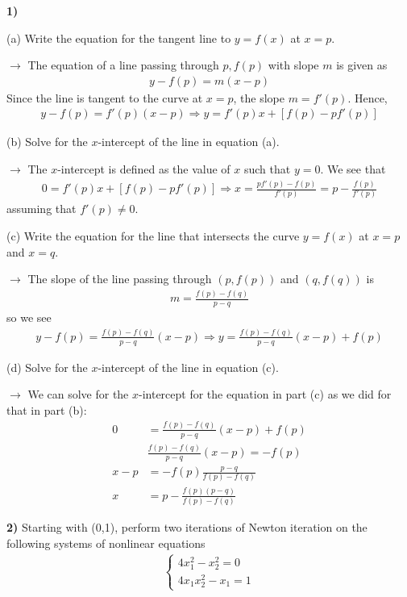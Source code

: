 \documentclass[12pt,a4paper]{article}
\newcommand{\prob}[2]{\textbf{#1)} #2}
\begin{document}
\prob{1}{}

(a) Write the equation for the tangent line to $y = f(x)$ at $x = p$.

$\rightarrow$ The equation of a line passing through $p,f(p)$ with slope $m$ is given as
\begin{align*}
y-f(p) = m(x-p)
\end{align*}
Since the line is tangent to the curve at $x = p$, the slope $m = f'(p)$. Hence,
\begin{align*}
y - f(p) = f'(p)(x-p) \Rightarrow y = f'(p)x + [f(p) - pf'(p)]
\end{align*}

(b) Solve for the $x$-intercept of the line in equation (a).

$\rightarrow$ The $x$-intercept is defined as the value of $x$ such that $y = 0$. We see that
\begin{align*}
0 = f'(p)x + [f(p) - pf'(p)] \Rightarrow x = \frac{pf'(p)-f(p)}{f'(p)} = p - \frac{f(p)}{f'(p)}
\end{align*}
assuming that $f'(p) \not= 0$.

(c) Write the equation for the line that intersects the curve $y = f(x)$ at $x = p$ and $x = q$.

$\rightarrow$ The slope of the line passing through $(p,f(p))$ and $(q,f(q))$ is 
\begin{align*}
m = \frac{f(p)-f(q)}{p-q}
\end{align*}
so we see
\begin{align*}
y - f(p) = \frac{f(p)-f(q)}{p-q}(x-p) \Rightarrow y = \frac{f(p)-f(q)}{p-q}(x-p) + f(p)
\end{align*}

(d) Solve for the $x$-intercept of the line in equation (c).

$\rightarrow$ We can solve for the $x$-intercept for the equation in part (c) as we did for that in part (b):
\begin{align*}
0 &= \frac{f(p)-f(q)}{p-q}(x-p) + f(p) \\
&\frac{f(p)-f(q)}{p-q}(x-p) = -f(p) \\
x-p &= -f(p)\frac{p-q}{f(p)-f(q)} \\
x &= p - \frac{f(p)(p-q)}{f(p)-f(q)}
\end{align*}

\prob{2}{Starting with (0,1), perform two iterations of Newton iteration on the following systems of nonlinear equations
\begin{align*}
\begin{cases}
4x_1^2 - x_2^2 = 0 \\
4x_1x_2^2 - x_1 = 1
\end{cases}
\end{align*}
}
\end{document}
